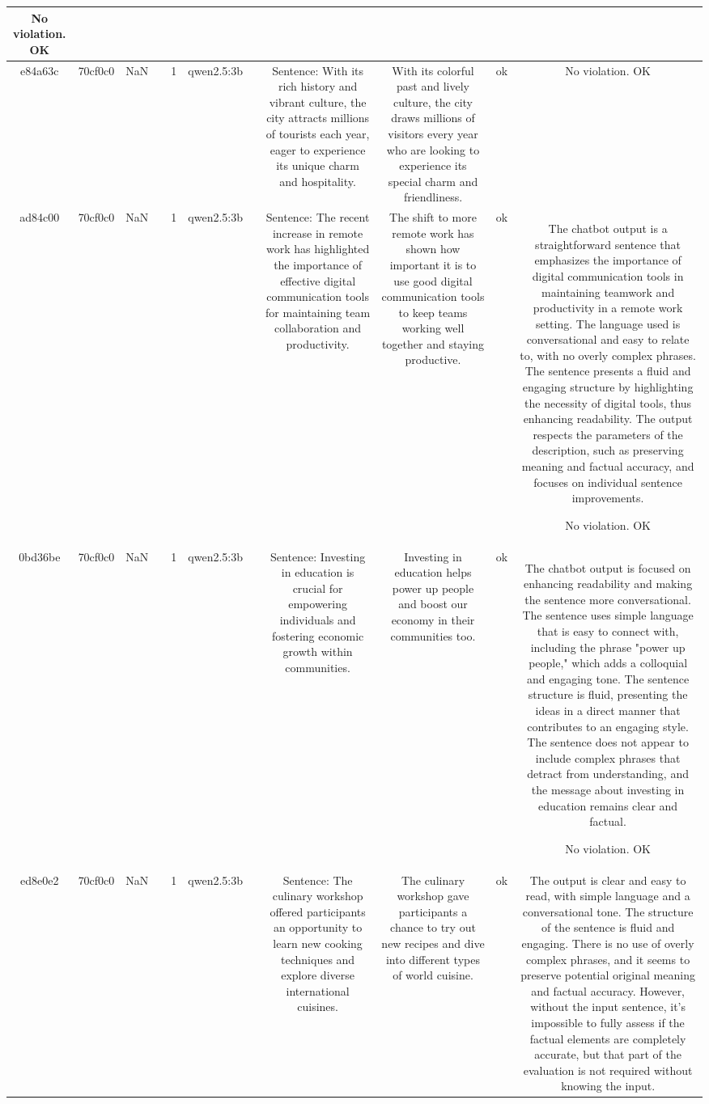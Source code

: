 \begin{table}[h!]
\begin{tabular}{|c|c|c|c|c|c|c|c|c|c|c|}
No violation.
OK\\
\hline
e84a63c & 70cf0c0 & NaN &  & 1 & qwen2.5:3b &  & Sentence: With its rich history and vibrant culture, the city attracts millions of tourists each year, eager to experience its unique charm and hospitality. & With its colorful past and lively culture, the city draws millions of visitors every year who are looking to experience its special charm and friendliness. & ok & No violation.
OK\\
\hline
ad84c00 & 70cf0c0 & NaN &  & 1 & qwen2.5:3b &  & Sentence: The recent increase in remote work has highlighted the importance of effective digital communication tools for maintaining team collaboration and productivity. & The shift to more remote work has shown how important it is to use good digital communication tools to keep teams working well together and staying productive. & ok & The chatbot output is a straightforward sentence that emphasizes the importance of digital communication tools in maintaining teamwork and productivity in a remote work setting. The language used is conversational and easy to relate to, with no overly complex phrases. The sentence presents a fluid and engaging structure by highlighting the necessity of digital tools, thus enhancing readability. The output respects the parameters of the description, such as preserving meaning and factual accuracy, and focuses on individual sentence improvements.

No violation.
OK\\
\hline
0bd36be & 70cf0c0 & NaN &  & 1 & qwen2.5:3b &  & Sentence: Investing in education is crucial for empowering individuals and fostering economic growth within communities. & Investing in education helps power up people and boost our economy in their communities too. & ok & The chatbot output is focused on enhancing readability and making the sentence more conversational. The sentence uses simple language that is easy to connect with, including the phrase "power up people," which adds a colloquial and engaging tone. The sentence structure is fluid, presenting the ideas in a direct manner that contributes to an engaging style. The sentence does not appear to include complex phrases that detract from understanding, and the message about investing in education remains clear and factual.

No violation.
OK\\
\hline
ed8e0e2 & 70cf0c0 & NaN &  & 1 & qwen2.5:3b &  & Sentence: The culinary workshop offered participants an opportunity to learn new cooking techniques and explore diverse international cuisines. & The culinary workshop gave participants a chance to try out new recipes and dive into different types of world cuisine. & ok & The output is clear and easy to read, with simple language and a conversational tone. The structure of the sentence is fluid and engaging. There is no use of overly complex phrases, and it seems to preserve potential original meaning and factual accuracy. However, without the input sentence, it's impossible to fully assess if the factual elements are completely accurate, but that part of the evaluation is not required without knowing the input.


\end{tabular}
\end{table}

